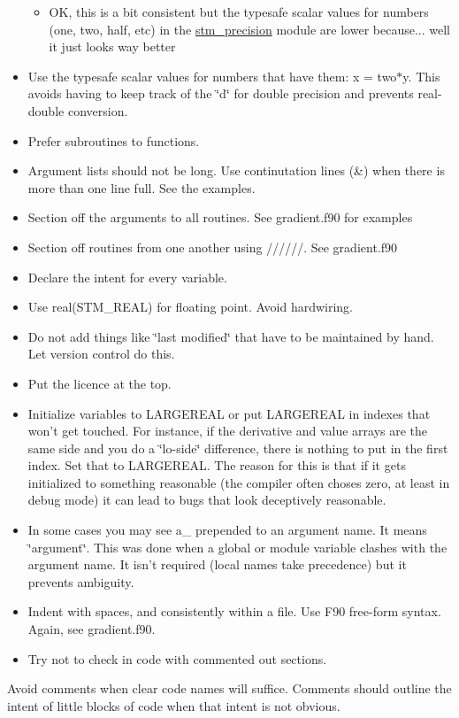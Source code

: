 \begin{itemize}
\begin{itemize}
\item OK, this is a bit consistent but the typesafe scalar values for numbers (one, two, half, etc) in the \hyperlink{a00071}{stm\_\-precision} module are lower because... well it just looks way better\end{itemize}
\item Use the typesafe scalar values for numbers that have them: x = two$\ast$y. This avoids having to keep track of the \char`\"{}d\char`\"{} for double precision and prevents real-double conversion.\item Prefer subroutines to functions.\item Argument lists should not be long. Use continutation lines (\&) when there is more than one line full. See the examples.\item Section off the arguments to all routines. See gradient.f90 for examples\item Section off routines from one another using //////. See gradient.f90\item Declare the intent for every variable.\item Use real(STM\_\-REAL) for floating point. Avoid hardwiring.\item Do not add things like \char`\"{}last modified\char`\"{} that have to be maintained by hand. Let version control do this.\item Put the licence at the top.\item Initialize variables to LARGEREAL or put LARGEREAL in indexes that won't get touched. For instance, if the derivative and value arrays are the same side and you do a \char`\"{}lo-side\char`\"{} difference, there is nothing to put in the first index. Set that to LARGEREAL. The reason for this is that if it gets initialized to something reasonable (the compiler often choses zero, at least in debug mode) it can lead to bugs that look deceptively reasonable.\item In some cases you may see a\_\- prepended to an argument name. It means \char`\"{}argument\char`\"{}. This was done when a global or module variable clashes with the argument name. It isn't required (local names take precedence) but it prevents ambiguity.\item Indent with spaces, and consistently within a file. Use F90 free-form syntax. Again, see gradient.f90.\item Try not to check in code with commented out sections.\end{itemize}


Avoid comments when clear code names will suffice. Comments should outline the intent of little blocks of code when that intent is not obvious. 
